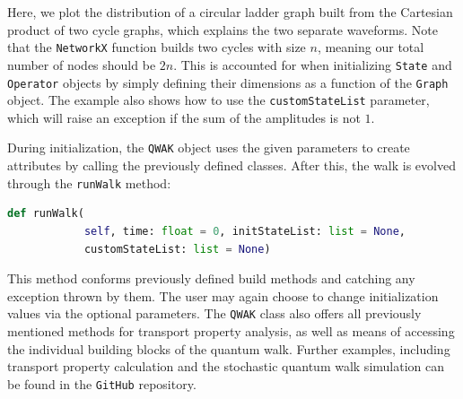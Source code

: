 \documentclass[../../dissertation.tex]{subfiles}
\begin{document}
Here, we plot the distribution of a circular ladder graph built from the
Cartesian product of two cycle graphs, which explains the two separate
waveforms. Note that the \texttt{NetworkX} function builds two cycles with size
$n$, meaning our total number of nodes should be $2n$. This is accounted for
when initializing \texttt{State} and \texttt{Operator} objects by simply
defining their dimensions as a function of the \texttt{Graph} object. The
example also shows how to use the \texttt{customStateList} parameter, which
will raise an exception if the sum of the amplitudes is not $1$.\par

During initialization, the \texttt{QWAK} object uses the given parameters to
create attributes by calling the previously defined classes. After this, the
walk is evolved through the \texttt{runWalk} method: 
\begin{lstlisting}[style=commands,mathescape,language=Python]
    def runWalk(
            self, time: float = 0, initStateList: list = None, 
            customStateList: list = None) 
\end{lstlisting}
This method conforms previously defined build methods and catching any
exception thrown by them. The user may again choose to change initialization
values via the optional parameters. The \texttt{QWAK} class also offers all
previously mentioned methods for transport property analysis, as well as means
of accessing the individual building blocks of the quantum walk.  Further
examples, including transport property calculation and the stochastic quantum
walk simulation can be found in the \texttt{GitHub} repository. 
\end{document}

